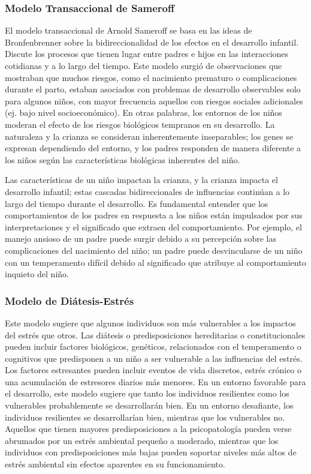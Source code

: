 \documentclass[11pt,letterpaper]{report}
\begin{document}
\subsubsection{Modelo Transaccional de Sameroff}
El modelo transaccional de Arnold Sameroff se basa en las ideas de
Bronfenbrenner sobre la bidireccionalidad de los efectos en el desarrollo
infantil. Discute los procesos que tienen lugar entre padres e hijos en las
interacciones cotidianas y a lo largo del tiempo. Este modelo surgió de
observaciones que mostraban que muchos riesgos, como el nacimiento prematuro o
complicaciones durante el parto, estaban asociados con problemas de desarrollo
observables solo para algunos niños, con mayor frecuencia aquellos con riesgos
sociales adicionales (ej. bajo nivel socioeconómico). En otras
palabras, los entornos de los niños moderan el efecto de los riesgos
biológicos tempranos en su desarrollo. La naturaleza y la crianza se consideran
inherentemente inseparables; los genes se expresan dependiendo del entorno, y
los padres responden de manera diferente a los niños según las características
biológicas inherentes del niño. \cite{Feldman3}

Las características de un niño impactan la crianza, y la crianza impacta el
desarrollo infantil; estas cascadas bidireccionales de influencias continúan a
lo largo del tiempo durante el desarrollo. Es fundamental entender que los
comportamientos de los padres en respuesta a los niños están impulsados por
sus interpretaciones y el significado que extraen del comportamiento. Por
ejemplo, el manejo ansioso de un padre puede surgir debido a su percepción
sobre las complicaciones del nacimiento del niño; un padre puede desvincularse
de un niño con un temperamento difícil debido al significado que atribuye al
comportamiento inquieto del niño. \cite{Sameroff2009}

\subsubsection{Modelo de Diátesis-Estrés}
Este modelo sugiere que algunos individuos son más vulnerables a los impactos
del estrés que otros. Las diátesis o predisposiciones hereditarias o
constitucionales pueden incluir factores biológicos, genéticos, relacionados
con el temperamento o cognitivos que predisponen a un niño a ser vulnerable a
las influencias del estrés. Los factores estresantes pueden incluir eventos de
vida discretos, estrés crónico o una acumulación de estresores diarios más
menores. En un entorno favorable para el desarrollo, este modelo sugiere que
tanto los individuos resilientes como los vulnerables probablemente se
desarrollarán bien. En un entorno desafiante, los individuos resilientes se
desarrollarían bien, mientras que los vulnerables no. Aquellos que tienen
mayores predisposiciones a la psicopatología pueden verse abrumados por un
estrés ambiental pequeño a moderado, mientras que los individuos con 
predisposiciones más bajas pueden soportar niveles más altos de estrés
ambiental sin efectos aparentes en su funcionamiento. \cite{Feldman3}
\end{document}
